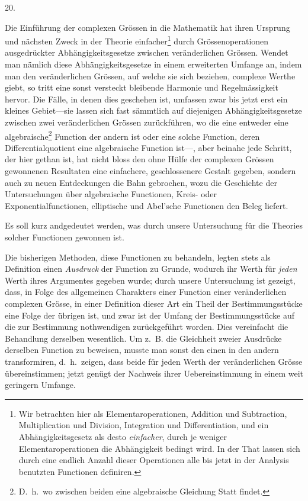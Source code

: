 \documentclass[a4paper,12pt]{article}
\begin{document}
\medbreak

\centerline{20.}

\nobreak\medskip

Die Einf\"{u}hrung der complexen Gr\"{o}ssen in die Mathematik
hat ihren Ursprung und n\"{a}chsten Zweck in der Theorie
einfacher\footnote{Wir betrachten hier als Elementaroperationen,
Addition und Subtraction, Multiplication und Division,
Integration und Differentiation, und ein Abh\"{a}ngigkeitsgesetz
als desto \emph{einfacher}, durch je weniger Elementaroperationen
die Abh\"{a}ngigkeit bedingt wird.  In der That lassen sich durch
eine endlich Anzahl dieser Operationen alle bis jetzt in der
Analysis benutzten Functionen definiren.}
durch Gr\"{o}ssenoperationen ausgedr\"{u}ckter
Abh\"{a}ngigkeitsgesetze zwischen ver\"{a}nderlichen Gr\"{o}ssen.
Wendet man n\"{a}mlich diese Abh\"{a}ngigkeitsgesetze in einem
erweiterten Umfange an, indem man den ver\"{a}nderlichen
Gr\"{o}ssen, auf welche sie sich beziehen, complexe Werthe giebt,
so tritt eine sonst versteckt bleibende Harmonie und
Regelm\"{a}ssigkeit hervor.  Die F\"{a}lle, in denen dies
geschehen ist, umfassen zwar bis jetzt erst ein kleines
Gebiet---sie lassen sich fast s\"{a}mmtlich auf diejenigen
Abh\"{a}ngigkeitsgesetze zwischen zwei ver\"{a}nderlichen
Gr\"{o}ssen zur\"{u}ckf\"{u}hren, wo die eine entweder eine
algebraische\footnote{D.~h.\ wo zwischen beiden eine algebraische
Gleichung Statt findet.}
Function der andern ist oder eine solche Function, deren
Differentialquotient eine algebraische Function ist---, aber
beinahe jede Schritt, der hier gethan ist, hat nicht bloss den
ohne H\"{u}lfe der complexen Gr\"{o}ssen gewonnenen Resultaten
eine einfachere, geschlossenere Gestalt gegeben, sondern auch zu
neuen Entdeckungen die Bahn gebrochen, wozu die Geschichte der
Untersuchungen \"{u}ber algebraische Functionen, Kreis- oder
Exponentialfunctionen, elliptische und Abel'sche Functionen den
Beleg liefert.

Es soll kurz andgedeutet werden, was durch unsere Untersuchung
f\"{u}r die Theories solcher Functionen gewonnen ist.

Die bisherigen Methoden, diese Functionen zu behandeln, legten
stets als Definition einen \emph{Ausdruck} der Function zu
Grunde, wodurch ihr Werth f\"{u}r \emph{jeden} Werth ihres
Argumentes gegeben wurde; durch unsere Untersuchung ist gezeigt,
dass, in Folge des allgemeinen Charakters einer Function einer
ver\"{a}nderlichen complexen Gr\"{o}sse, in einer Definition
dieser Art ein Theil der Bestimmungsst\"{u}cke eine Folge der
\"{u}brigen ist, und zwar ist der Umfang der
Bestimmungsst\"{u}cke auf die zur Bestimmung nothwendigen
zur\"{u}ckgef\"{u}hrt worden.  Dies vereinfacht die Behandlung
derselben wesentlich.  Um z.~B. die Gleichheit zweier
Ausdr\"{u}cke derselben Function zu beweisen, musste man sonst
den einen in den andern transformiren, d.~h.\ zeigen, dass beide
f\"{u}r jeden Werth der ver\"{a}nderlichen Gr\"{o}sse
\"{u}bereinstimmen; jetzt gen\"{u}gt der Nachweis ihrer
Uebereinstimmung in einem weit geringern Umfange.
\end{document}
